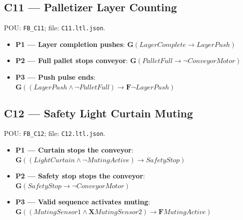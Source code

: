 \subsection*{C11 --- Palletizer Layer Counting}
\noindent POU: \texttt{FB\_C11}; file: \texttt{C11.ltl.json}.
\begin{small}
\begin{itemize}
\item \textbf{P1 --- Layer completion pushes}: $\mathbf{G}(LayerComplete \rightarrow LayerPush)$
\item \textbf{P2 --- Full pallet stops conveyor}: $\mathbf{G}(PalletFull \rightarrow \neg ConveyorMotor)$
\item \textbf{P3 --- Push pulse ends}: $\mathbf{G}((LayerPush \wedge \neg PalletFull) \rightarrow \mathbf{F} \neg LayerPush)$
\end{itemize}
\end{small}

\subsection*{C12 --- Safety Light Curtain Muting}
\noindent POU: \texttt{FB\_C12}; file: \texttt{C12.ltl.json}.
\begin{small}
\begin{itemize}
\item \textbf{P1 --- Curtain stops the conveyor}: $\mathbf{G}((LightCurtain \wedge \neg MutingActive) \rightarrow SafetyStop)$
\item \textbf{P2 --- Safety stop stops the conveyor}: $\mathbf{G}(SafetyStop \rightarrow \neg ConveyorMotor)$
\item \textbf{P3 --- Valid sequence activates muting}: $\mathbf{G}((MutingSensor1 \wedge \mathbf{X} MutingSensor2) \rightarrow \mathbf{F} MutingActive)$
\end{itemize}
\end{small}

